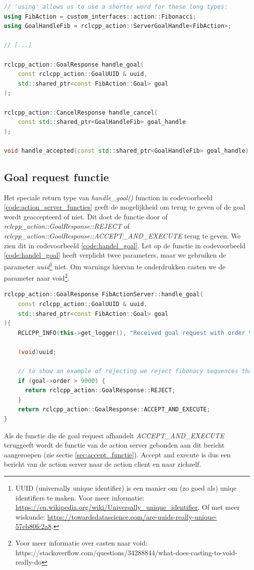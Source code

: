 \begin{lstlisting}[language=C++, caption={De \textit{action\_server\_} functies die de berichten afhandelen.}, firstnumber=0, label={code:action_server_functies}]
// 'using' allows us to use a shorter word for these long types:
using FibAction = custom_interfaces::action::Fibonacci;
using GoalHandleFib = rclcpp_action::ServerGoalHandle<FibAction>;

// [...]

rclcpp_action::GoalResponse handle_goal(
    const rclcpp_action::GoalUUID & uuid, 
    std::shared_ptr<const FibAction::Goal> goal
);

rclcpp_action::CancelResponse handle_cancel(
    const std::shared_ptr<GoalHandleFib> goal_handle
);

void handle_accepted(const std::shared_ptr<GoalHandleFib> goal_handle);
\end{lstlisting}

\subsection{Goal request functie}
\noindent Het speciale return type van  \textit{handle\_goal()} function in codevoorbeeld \ref{code:action_server_functies} geeft de mogelijkheid om terug te geven of de goal wordt geaccepteerd of niet. Dit doet de functie door of \textit{rclcpp\_action::GoalResponse::REJECT} of \textit{rclcpp\_action::GoalResponse::ACCEPT\_AND\_EXECUTE} terug te geven. We zien dit in codevoorbeeld \ref{code:handel_goal}. Let op de functie in codevoorbeeld \ref{code:handel_goal} heeft verplicht twee parameters, maar we gebruiken de parameter \textit{uuid}\footnote{UUID (universally unique identifier) is een manier om (zo goed als) uniqe identifiers te maken. Voor meer informatie: \url{https://en.wikipedia.org/wiki/Universally_unique_identifier}. Of met meer wiskunde: \url{https://towardsdatascience.com/are-uuids-really-unique-57eb80fc2a8}.} niet. Om warnings hiervan te onderdrukken casten we de parameter naar void\footnote{Voor meer informatie over casten naar void: https://stackoverflow.com/questions/34288844/what-does-casting-to-void-really-do}.
\begin{lstlisting}[language=C++, caption={De \textit{handle\_goal()} functie van \textit{action\_server\_}}, firstnumber=0, label={code:handel_goal}]
rclcpp_action::GoalResponse FibActionServer::handle_goal(
    const rclcpp_action::GoalUUID & uuid, 
    std::shared_ptr<const FibAction::Goal> goal
){
    RCLCPP_INFO(this->get_logger(), "Received goal request with order %d", goal->order);
    
    (void)uuid;
    
    // to show an example of rejecting we reject fibonacy sequences that are over 9000:
    if (goal->order > 9000) {
      return rclcpp_action::GoalResponse::REJECT;
    }
    return rclcpp_action::GoalResponse::ACCEPT_AND_EXECUTE;
}
\end{lstlisting}
Als de functie die de goal request afhandelt \textit{ACCEPT\_AND\_EXECUTE} teruggeeft wordt de functie van de action server gebonden aan dit bericht aangeroepen (zie sectie \ref{sec:accept_functie}). Accept and execute is dus een bericht van de action server naar de action client en naar zichzelf. 


